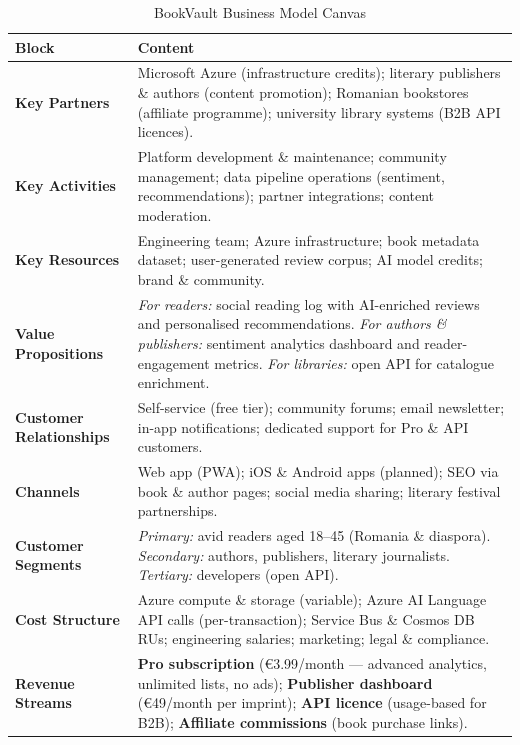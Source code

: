 \documentclass[12pt, a4paper]{report}
\begin{document}
\begin{table}[H]
  \centering
  \caption{BookVault Business Model Canvas}
  \begin{tabularx}{\textwidth}{L{3.5cm} X}
    \toprule
    \color{white}\textbf{Block} & \color{white}\textbf{Content} \\
    \midrule
    \textbf{Key Partners}
    & Microsoft Azure (infrastructure credits); literary publishers \& authors (content promotion);
      Romanian bookstores (affiliate programme); university library systems (B2B API licences). \\
    \textbf{Key Activities}
    & Platform development \& maintenance; community management; data pipeline operations
      (sentiment, recommendations); partner integrations; content moderation. \\
    \textbf{Key Resources}
    & Engineering team; Azure infrastructure; book metadata dataset; user-generated review corpus;
      AI model credits; brand \& community. \\
    \textbf{Value Propositions}
    & \textit{For readers:} social reading log with AI-enriched reviews and personalised
      recommendations. \textit{For authors \& publishers:} sentiment analytics dashboard and
      reader-engagement metrics. \textit{For libraries:} open API for catalogue enrichment. \\
    \textbf{Customer Relationships}
    & Self-service (free tier); community forums; email newsletter; in-app notifications;
      dedicated support for Pro \& API customers. \\
    \textbf{Channels}
    & Web app (PWA); iOS \& Android apps (planned); SEO via book \& author pages;
      social media sharing; literary festival partnerships. \\
    \textbf{Customer Segments}
    & \textit{Primary:} avid readers aged 18--45 (Romania \& diaspora). \textit{Secondary:}
      authors, publishers, literary journalists. \textit{Tertiary:} developers (open API). \\
    \textbf{Cost Structure}
    & Azure compute \& storage (variable); Azure AI Language API calls (per-transaction);
      Service Bus \& Cosmos DB RUs; engineering salaries; marketing; legal \& compliance. \\
    \textbf{Revenue Streams}
    & \textbf{Pro subscription} (€3.99/month — advanced analytics, unlimited lists, no ads);
      \textbf{Publisher dashboard} (€49/month per imprint); \textbf{API licence} (usage-based
      for B2B); \textbf{Affiliate commissions} (book purchase links). \\
    \bottomrule
  \end{tabularx}
\end{table}
\end{document}
